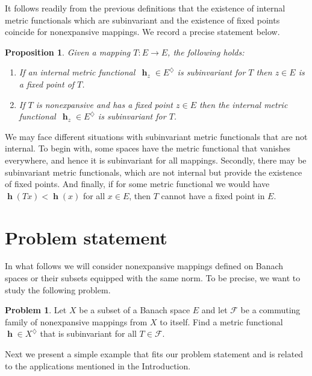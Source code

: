 \documentclass[a4paper,12pt]{article}
\newtheorem{proposition}[theorem]{Proposition}
\theoremstyle{definition}
\newtheorem*{problem}{Problem}
\numberwithin{equation}{section}
\newcommand{\F}{\mathcal{F}} %
\numberwithin{equation}{section}
\DeclareMathOperator{\h}{\mathbf{h}} %
\begin{document}
It follows readily from the previous 
definitions that the existence of internal 
metric functionals which are subinvariant and 
the existence of fixed points coincide for 
nonexpansive mappings. We record a precise
statement below.

\begin{proposition}
\label{proppu1}  
Given a mapping $T: E \to E$, the 
following holds: 
\begin{enumerate}
\item If an internal metric functional 
    $\,\h_z \in E^\diamondsuit$ is subinvariant 
    for $T$ then $z\in E$ is a fixed point 
    of $T$.
\item If $T$ is nonexpansive and has a fixed 
    point $z\in E$ then the internal metric 
    functional $\,\h_z \in E^\diamondsuit$ is 
    subinvariant for $T$.
\end{enumerate}
\end{proposition}

We may face different situations with 
subinvariant metric functionals that are not 
internal. To begin with, some spaces have the 
metric functional that vanishes everywhere, 
and hence it is subinvariant for all mappings. 
Secondly, there may be subinvariant metric 
functionals, which are not internal but 
provide the existence of fixed points. And 
finally, if for some metric functional we 
would have $\h(Tx) < \h(x)$ for all $x\in E$, 
then $T$ cannot have a fixed point in $E$. 

\section{Problem statement}

In what follows we will consider  
nonexpansive mappings defined on Banach 
spaces or their subsets equipped with the 
same norm. To be precise, we want to study 
the following problem.

\begin{mdframed}
\begin{problem}
Let $X$ be a subset of a Banach space $E$ and 
let $\F$ be a commuting family of 
nonexpansive mappings from $X$ to itself. 
Find a metric functional 
$\h\in X^\diamondsuit$ that is subinvariant
for all $T\in\F$.    
\end{problem}  
\end{mdframed}

Next we present a simple example that fits 
our problem statement and is related to the 
applications mentioned in the Introduction.
\end{document}
